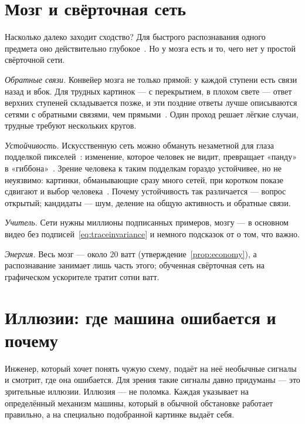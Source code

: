 \section{Мозг и свёрточная сеть}

Насколько далеко заходит сходство? Для быстрого распознавания одного предмета оно действительно глубокое~\cite{Yamins2014}. Но у мозга есть и то, чего нет у простой свёрточной сети.

\emph{Обратные связи.} Конвейер мозга не только прямой: у каждой ступени есть связи назад и вбок. Для трудных картинок --- с перекрытием, в плохом свете --- ответ верхних ступеней складывается позже, и эти поздние ответы лучше описываются сетями с обратными связями, чем прямыми~\cite{Kar2019}. Один проход решает лёгкие случаи, трудные требуют нескольких кругов.

\emph{Устойчивость.} Искусственную сеть можно обмануть незаметной для глаза подделкой пикселей~\cite{Szegedy2014}: изменение, которое человек не видит, превращает «панду» в «гиббона»~\cite{Goodfellow2015}. Зрение человека к таким подделкам гораздо устойчивее, но не неуязвимо: картинки, обманывающие сразу много сетей, при коротком показе сдвигают и выбор человека~\cite{Elsayed2018}. Почему устойчивость так различается --- вопрос открытый; кандидаты --- шум, деление на общую активность и обратные связи.

\emph{Учитель.} Сети нужны миллионы подписанных примеров, мозгу --- в основном видео без подписей~\eqref{eq:traceinvariance} и немного подсказок от  о том, что важно.

\emph{Энергия.} Весь мозг --- около $20$ ватт (утверждение~\ref{prop:economy}), а распознавание занимает лишь часть этого; обученная свёрточная сеть на графическом ускорителе тратит сотни ватт.

\section{Иллюзии: где машина ошибается и почему}
\label{sec:illusions}

Инженер, который хочет понять чужую схему, подаёт на неё необычные сигналы и смотрит, где она ошибается. Для зрения такие сигналы давно придуманы --- это зрительные иллюзии. Иллюзия --- не поломка. Каждая указывает на определённый механизм машины, который в обычной обстановке работает правильно, а на специально подобранной картинке выдаёт себя.


